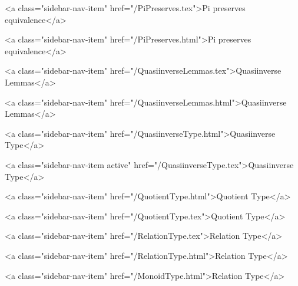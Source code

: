       
        
          <a class="sidebar-nav-item" href="/PiPreserves.tex">Pi preserves equivalence</a>
        
      
    
      
        
          <a class="sidebar-nav-item" href="/PiPreserves.html">Pi preserves equivalence</a>
        
      
    
      
        
          <a class="sidebar-nav-item" href="/QuasiinverseLemmas.tex">Quasiinverse Lemmas</a>
        
      
    
      
        
          <a class="sidebar-nav-item" href="/QuasiinverseLemmas.html">Quasiinverse Lemmas</a>
        
      
    
      
        
          <a class="sidebar-nav-item" href="/QuasiinverseType.html">Quasiinverse Type</a>
        
      
    
      
        
          <a class="sidebar-nav-item active" href="/QuasiinverseType.tex">Quasiinverse Type</a>
        
      
    
      
        
          <a class="sidebar-nav-item" href="/QuotientType.html">Quotient Type</a>
        
      
    
      
        
          <a class="sidebar-nav-item" href="/QuotientType.tex">Quotient Type</a>
        
      
    
      
        
          <a class="sidebar-nav-item" href="/RelationType.tex">Relation Type</a>
        
      
    
      
        
          <a class="sidebar-nav-item" href="/RelationType.html">Relation Type</a>
        
      
    
      
        
          <a class="sidebar-nav-item" href="/MonoidType.html">Relation Type</a>
        
